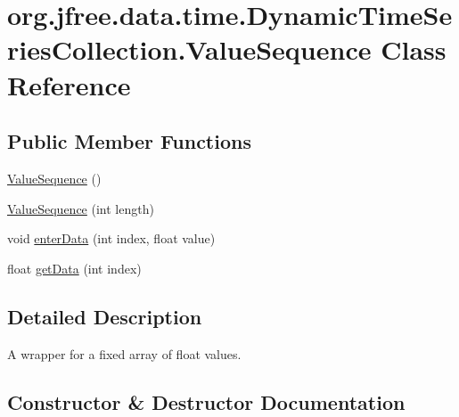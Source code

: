 \hypertarget{classorg_1_1jfree_1_1data_1_1time_1_1_dynamic_time_series_collection_1_1_value_sequence}{}\section{org.\+jfree.\+data.\+time.\+Dynamic\+Time\+Series\+Collection.\+Value\+Sequence Class Reference}
\label{classorg_1_1jfree_1_1data_1_1time_1_1_dynamic_time_series_collection_1_1_value_sequence}
\subsection*{Public Member Functions}
\begin{DoxyCompactItemize}
\item 
\mbox{\hyperlink{classorg_1_1jfree_1_1data_1_1time_1_1_dynamic_time_series_collection_1_1_value_sequence_a934b1955dbc0a68d573feecf70671a9a}{Value\+Sequence}} ()
\item 
\mbox{\hyperlink{classorg_1_1jfree_1_1data_1_1time_1_1_dynamic_time_series_collection_1_1_value_sequence_a204f4f1cee8be7a0043247a24f1b62ee}{Value\+Sequence}} (int length)
\item 
void \mbox{\hyperlink{classorg_1_1jfree_1_1data_1_1time_1_1_dynamic_time_series_collection_1_1_value_sequence_a36fd6b8acf00765ce6bad04ad1791411}{enter\+Data}} (int index, float value)
\item 
float \mbox{\hyperlink{classorg_1_1jfree_1_1data_1_1time_1_1_dynamic_time_series_collection_1_1_value_sequence_a21ad1cdf4a6e9bc520bd5ea80be19f5d}{get\+Data}} (int index)
\end{DoxyCompactItemize}


\subsection{Detailed Description}
A wrapper for a fixed array of float values. 

\subsection{Constructor \& Destructor Documentation}
\mbox{\label{classorg_1_1jfree_1_1data_1_1time_1_1_dynamic_time_series_collection_1_1_value_sequence_a934b1955dbc0a68d573feecf70671a9a}} 

